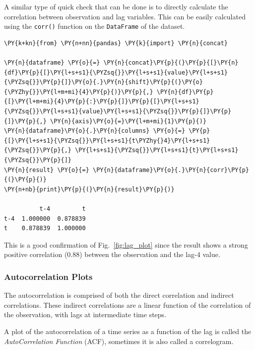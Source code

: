 A similar type of quick check that can be done is to directly calculate
the correlation between observation and lag variables. This
can be easily calculated using the \texttt{corr()} function
on the \texttt{DataFrame} of the dataset.

\begin{tcolorbox}[breakable, size=fbox, boxrule=1pt, pad at break*=1mm,colback=cellbackground, colframe=cellborder]
\begin{Verbatim}[commandchars=\\\{\}]
\PY{k+kn}{from} \PY{n+nn}{pandas} \PY{k}{import} \PY{n}{concat}

\PY{n}{dataframe} \PY{o}{=} \PY{n}{concat}\PY{p}{(}\PY{p}{[}\PY{n}{df}\PY{p}{[}\PY{l+s+s1}{\PYZsq{}}\PY{l+s+s1}{value}\PY{l+s+s1}{\PYZsq{}}\PY{p}{]}\PY{o}{.}\PY{n}{shift}\PY{p}{(}\PY{o}{\PYZhy{}}\PY{l+m+mi}{4}\PY{p}{)}\PY{p}{,} \PY{n}{df}\PY{p}{[}\PY{l+m+mi}{4}\PY{p}{:}\PY{p}{]}\PY{p}{[}\PY{l+s+s1}{\PYZsq{}}\PY{l+s+s1}{value}\PY{l+s+s1}{\PYZsq{}}\PY{p}{]}\PY{p}{]}\PY{p}{,} \PY{n}{axis}\PY{o}{=}\PY{l+m+mi}{1}\PY{p}{)}
\PY{n}{dataframe}\PY{o}{.}\PY{n}{columns} \PY{o}{=} \PY{p}{[}\PY{l+s+s1}{\PYZsq{}}\PY{l+s+s1}{t\PYZhy{}4}\PY{l+s+s1}{\PYZsq{}}\PY{p}{,} \PY{l+s+s1}{\PYZsq{}}\PY{l+s+s1}{t}\PY{l+s+s1}{\PYZsq{}}\PY{p}{]}
\PY{n}{result} \PY{o}{=} \PY{n}{dataframe}\PY{o}{.}\PY{n}{corr}\PY{p}{(}\PY{p}{)}
\PY{n+nb}{print}\PY{p}{(}\PY{n}{result}\PY{p}{)}

          t-4         t
t-4  1.000000  0.878839
t    0.878839  1.000000
\end{Verbatim}
\end{tcolorbox}

This is a good confirmation of Fig.~\ref{fig:lag_plot} since the result 
shows a strong
positive correlation (0.88) between the observation and the lag-4 value.

\subsubsection{Autocorrelation Plots}
\label{autocorrelation-plots}

The autocorrelation is comprised of both
the direct correlation and indirect correlations. These indirect
correlations are a linear function of the correlation of the
observation, with lags at intermediate time steps.

A plot of the autocorrelation of a time series as a function of the lag 
is called the \emph{AutoCorrelation Function} (ACF), sometimes it is 
also called a correlogram.

